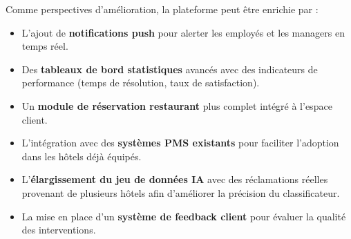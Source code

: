 \medskip

Comme perspectives d'amélioration, la plateforme peut être enrichie par :
\begin{itemize}
    \item L'ajout de \textbf{notifications push} pour alerter les employés et les managers en temps réel.
    \item Des \textbf{tableaux de bord statistiques} avancés avec des indicateurs de performance (temps de résolution, taux de satisfaction).
    \item Un \textbf{module de réservation restaurant} plus complet intégré à l'espace client.
    \item L'intégration avec des \textbf{systèmes PMS existants} pour faciliter l'adoption dans les hôtels déjà équipés.
    \item L'\textbf{élargissement du jeu de données IA} avec des réclamations réelles provenant de plusieurs hôtels afin d'améliorer la précision du classificateur.
    \item La mise en place d'un \textbf{système de feedback client} pour évaluer la qualité des interventions.
\end{itemize}
